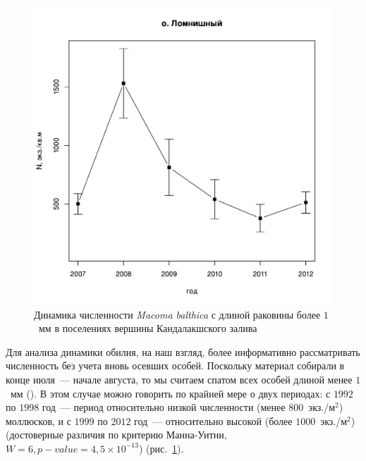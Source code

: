 \begin{figure}[p]
\begin{minipage}[b]{.49\linewidth}
\begin{center}
	\end{center}
	\end{minipage}
%
	\hfil %
%
	\begin{minipage}[b]{.49\linewidth}
	\begin{center}
		\includegraphics[width=\linewidth]{../White_Sea/Lomnishniy/N2_dynamic1.pdf}
	\end{center}
	\end{minipage}



	\caption{Динамика численности {\it Macoma balthica} с длиной раковины более $1$~мм в поселениях вершины Кандалакшского залива}
	\label{ris:dynamic_Kandalaksha_all2}
	\end{figure}



Для анализа динамики обилия, на наш взгляд, более информативно рассматривать численность без учета вновь осевших особей. 
Поскольку материал собирали в конце июля~--- начале августа, то мы считаем спатом всех особей длиной менее $1$~мм (\cite{Zubakha_et_al_2000}).
В этом случае можно говорить по крайней мере о двух периодах: с $1992$ по $1998$ год~--- период относительно низкой численности (менее $800$~экз./м$^2$) моллюсков, и с $1999$ по $2012$ год~--- относительно высокой (более $1000$~экз./м$^2$) (достоверные различия по критерию Манна-Уитни, $W = 6, p-value = 4,5 \times 10^{-13}$) (рис.~\ref{ris:dynamic_Kandalaksha_all2}).

